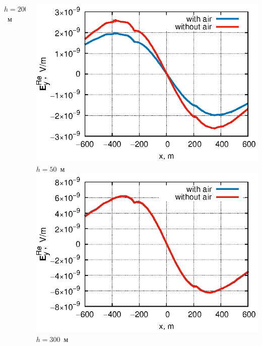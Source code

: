 \documentclass[aspectratio=43,usepdftitle=false]{beamer}
\begin{document}
\begin{frame}
\begin{columns}[t,totalwidth=\linewidth]
\begin{column}{.5\linewidth}
\begin{center}
			\tiny{$h=200$~м} \\
			\end{center}
		\end{column}
		\begin{column}{.5\linewidth}
			\vspace{-1.7em}
			\begin{center}
			\includegraphics[width=\textwidth,height=0.4\textheight,keepaspectratio]{deep_-50.eps} \\
			\vspace{-0.1em}
			\tiny{$h=50$~м} \\
			\includegraphics[width=\textwidth,height=0.4\textheight,keepaspectratio]{deep_-300.eps} \\
			\vspace{-0.1em}
			\tiny{$h=300$~м} \\
			\end{center}
		\end{column}
	\end{columns}
\end{frame}
\end{document}
